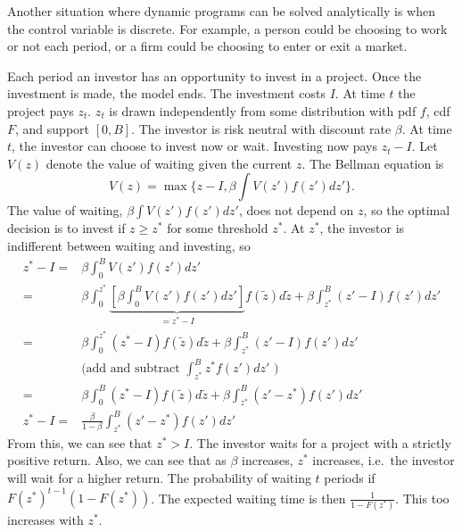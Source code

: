Another situation where dynamic programs can be solved analytically is
when the control variable is discrete. For example, a person could be
choosing to work or not each period, or a firm could be choosing to
enter or exit a market. 

\begin{example}
  Each period an investor has an opportunity to invest in a
  project. Once the investment is made, the model ends. The investment
  costs $I$. At time $t$ the project pays $z_t$. $z_t$ is drawn
  independently from some distribution with pdf $f$, cdf $F$, and
  support $[0, B]$.
  The investor is risk neutral with discount rate $\beta$. At
  time $t$, the investor can choose to invest now or wait. Investing
  now pays $z_t - I$. Let $V(z)$ denote the value of waiting given the
  current $z$. The Bellman equation is 
  \[ V(z) = \max\{ z- I , \beta \int V(z') f(z') dz' \}. \]
  The value of waiting, $\beta \int V(z') f(z') dz'$, does not depend
  on $z$, so the optimal decision is to invest if $z \geq z^*$ for
  some threshold $z^*$. At $z^*$, the investor is indifferent between
  waiting and investing, so
  \begin{align*}
    z^* - I = & \beta \int_0^B V(z') f(z') dz' \\
    = & \beta \int_0^{z^*} \underbrace{\left[\beta \int_0^B V(z')
        f(z') dz'\right]}_{=z^* - I}
    f(\tilde{z}) d\tilde{z} + \beta \int_{z^*}^B (z' - I) f(z') dz' \\
    = & \beta \int_0^{z^*} (z^* - I) f(\tilde{z}) d\tilde{z} + \beta
    \int_{z^*}^B (z' - I) f(z') dz' \\
    & \text{(add and subtract $\int_{z^*}^B z^* f(z')dz'$ )} \\
    = & \beta \int_0^{B} (z^* - I) f(\tilde{z}) d\tilde{z} + \beta
    \int_{z^*}^B (z' - z^*) f(z') dz' \\
    z^* - I = & \frac{\beta}{1-\beta} \int_{z^*}^B (z' - z^*) f(z') dz'
  \end{align*}
  From this, we can see that $z^* > I$. The investor waits for a
  project with a strictly positive return. Also, we can see that as
  $\beta$ increases, $z^*$ increases, i.e.\ the investor will wait for
  a higher return. The probability of waiting $t$ periods if
  $F(z^*)^{t-1} (1-F(z^*))$. The expected waiting time is then
  $\frac{1}{1-F(z^*)}$. This too increases with $z^*$. 


\end{example}
